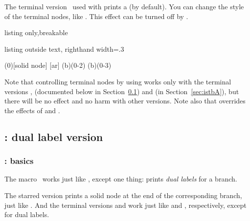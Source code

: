 The terminal version \cmd{\istbt}\ used  with \icmd{\xtShowTerminalNodes} prints a  (by default). 
You can change the style of the terminal nodes, like .
This effect can be turned off by \icmd{\xtHideTerminalNodes}.

\begin{tcblisting}{listing only,breakable}
\end{tcblisting}

\begin{tcblisting}{listing outside text, righthand width=.3\linewidth}
\begin{istgame}
\xtShowTerminalNodes[box node,fill=green]
\istroot(0)[solid node]
  \istb
  [ar]
  \endist
\xtdistance{15mm}{10mm}
\istroot(b)(0-2) \istbt*  \istbt  \endist
\xtHideTerminalNodes
\istroot(b)(0-3) \istbt   \istbt  \endist
\end{istgame}
\end{tcblisting}

\remark
Note that controlling terminal nodes by using \cmd{\xtShowTerminalNodes} works only with the terminal versions \cmd{\istbt}, \cmd{\istBt} (documented below in Section~\ref{sec:istB}) and \cmd{\istbAt} (in Section~\ref{sec:istbA}), but there will be no effect and no harm with other versions.
Note also that \icmd{\istbt*} overrides the effects of \cmd{\xtShowTerminalNodes} and \cmd{\xtHideTerminalNodes}.

\subsection{\protect\cmd{\istB}: dual label version}
\label{sec:istB}

\subsubsection{\protect\cmd{\istB}: basics}

The macro \icmd{\istB}\ works just like \cmd{\istb}, except one thing: \cmd{\istB} prints \emph{dual labels} for a branch.

The starred version \icmd{\istB*} prints a solid node at the end of the corresponding branch, just like \cmd{\istb*}.
And the terminal versions \cmd{\istBt} and \icmd{\istBt*} work just like \cmd{\istbt} and \cmd{\istbt*}, respectively, except for dual labels.

